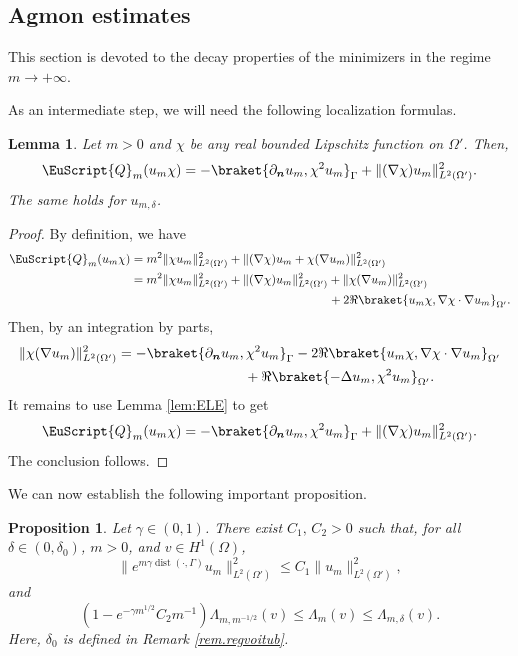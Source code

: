 \documentclass[JEP,XML,SOM,Unicode]{cedram}
\let\mathcal \EuScript
\newcommand{\cQ}{\mathcal{Q}}
\DeclareMathOperator{\dist}{dist}
\theoremstyle{plain}
\newtheorem{lemma}[theorem]{Lemma}
\newtheorem{proposition}[theorem]{Proposition}
\theoremstyle{definition}
\newcommand{\bn}{{\boldsymbol n}}
\let\pa\partial
\begin{document}
\subsection{Agmon estimates}\label{sec.Agmon}
This section is devoted to the decay properties of the minimizers in the regime $m\to+\infty$.

As an intermediate step, we will need the following localization formulas.

\begin{lemma}\label{lem.IMS}
Let $m>0$ and $\chi$ be any real bounded Lipschitz function on $\Omega'$.
Then,
\begin{equation}\label{eq:idfq1}
\cQ_m(u_m\chi) = -\braket{\pa_\bn u_m,\chi^2u_m}_{\Gamma} + \|(\nabla\chi) u_m \|^2_{L^2(\Omega')}.
\end{equation}
The same holds for $u_{m,\delta}$.
\end{lemma}

\begin{proof}
By definition, we have
\[\begin{split}
\cQ_m(u_m\chi)
&=
m^2\|\chi u_m\|^2_{L^2(\Omega')} + \|(\nabla\chi) u_m + \chi(\nabla u_m)\|^2_{L^2(\Omega')}
\\
&
=
m^2\|\chi u_m\|^2_{L^2(\Omega')}
+ \|(\nabla\chi) u_m \|^2_{L^2(\Omega')} + \| \chi(\nabla u_m)\|^2_{L^2(\Omega')}\\
&\hspace*{5.75cm}+ 2\Re\braket{u_m\chi, \nabla\chi\cdot \nabla u_m}_{\Omega'}.
\end{split}\]
Then, by an integration by parts,
\[\begin{split}
\| \chi(\nabla u_m)\|^2_{L^2(\Omega')} &= -\braket{\pa_\bn u_m,\chi^2u_m}_{\Gamma} -2\Re\braket{u_m\chi, \nabla\chi\cdot \nabla u_m}_{\Omega'}\\
&\hspace*{3.2cm}+ \Re\braket{-\Delta u_m,\chi^2 u_m}_{\Omega'}.
\end{split}\]
It remains to use Lemma \ref{lem:ELE} to get
\[
\cQ_m(u_m\chi) = -\braket{\pa_\bn u_m,\chi^2u_m}_{\Gamma} + \|(\nabla\chi) u_m \|^2_{L^2(\Omega')}.
\]
The conclusion follows.
\end{proof}

We can now establish the following important proposition.
\begin{proposition}\label{lem:agmon1}
Let $\gamma\!\in\!(0,1)$.
There exist $C_1,\,C_2\!>\!0$ such that, for all $\delta\!\in\!(0,\delta_0)$, $m>0$, and $v\in H^1(\Omega)$,
\begin{equation}\label{eq.agmon1a}
\|e^{m\gamma\dist(\cdot, \Gamma)}u_m\|^2_{L^2(\Omega')}\leq C_1 \|u_m\|^2_{L^2(\Omega')},
\end{equation}
and
\begin{equation}\label{eq.agmon1b}
(1 - e^{-\gamma m^{1/2}}C_2m^{-1})\Lambda_{m,m^{-1/2}}(v)\leq\Lambda_{m}(v)\leq\Lambda_{m,\delta}(v).
\end{equation}
Here, $\delta_0$ is defined in Remark \ref{rem.regvoitub}.
\end{proposition}
\end{document}
